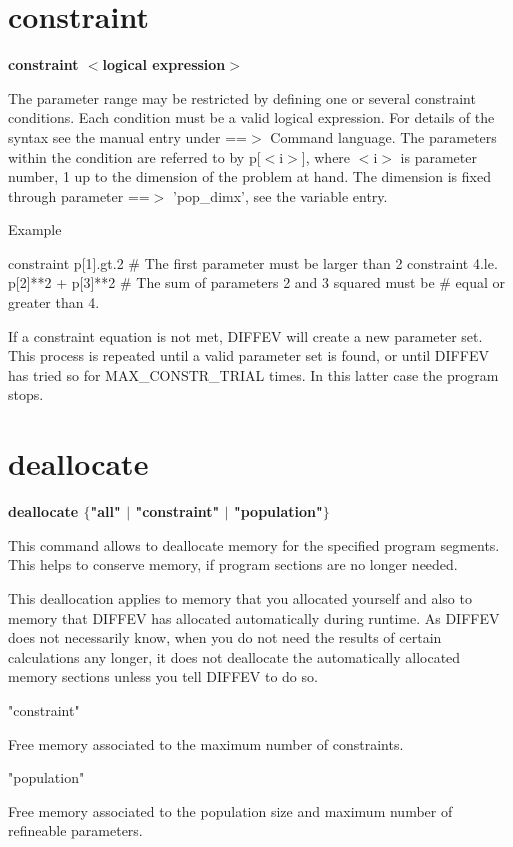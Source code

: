 \section{constraint}
{\bf constraint $ <$logical expression$> $ \par }
\par
\vspace{3pt}
The parameter range may be restricted by defining one or several constraint 
conditions. Each condition must be a valid logical expression. For 
details of the syntax see the manual entry under ==$> $ Command language. 
The parameters within the condition are referred to by p[$ <$i$> $], where 
$ <$i$> $ is parameter number, 1 up to the dimension of the problem at hand. 
The dimension is fixed through parameter ==$> $ 'pop\_dimx', see the 
variable entry. 
\par
Example 
\par
\begin{MacVerbatim}
constraint  p[1].gt.2   # The first parameter must be larger than 2
constraint  4.le. p[2]**2 + p[3]**2
                        # The sum of parameters 2 and 3 squared must be
                        #  equal or greater than 4.
\end{MacVerbatim}
If a constraint equation is not met, DIFFEV will create a new parameter 
set. This process is repeated until a valid parameter set is found, or 
until DIFFEV has tried so for MAX\_CONSTR\_TRIAL times. In this latter 
case the program stops. 
\section{deallocate}
{\bf deallocate $ \{$"all" $| $ "constraint" $| $ "population"$\} $ \par }
\par
\vspace{3pt}
This command allows to deallocate memory for the specified program 
segments. This helps to conserve memory, if program sections are no 
longer needed. 
\par
This deallocation applies to memory that you allocated yourself 
and also to memory that DIFFEV has allocated automatically during 
runtime. As DIFFEV does not necessarily know, when you do not need 
the results of certain calculations any longer, it does not 
deallocate the automatically allocated memory sections unless you 
tell DIFFEV to do so. 
\par
\begin{MacVerbatim}
"constraint"
\end{MacVerbatim}
   Free memory associated to the maximum number of constraints. 
\par
\begin{MacVerbatim}
"population"
\end{MacVerbatim}
   Free memory associated to the population size and maximum number 
   of refineable parameters. 
